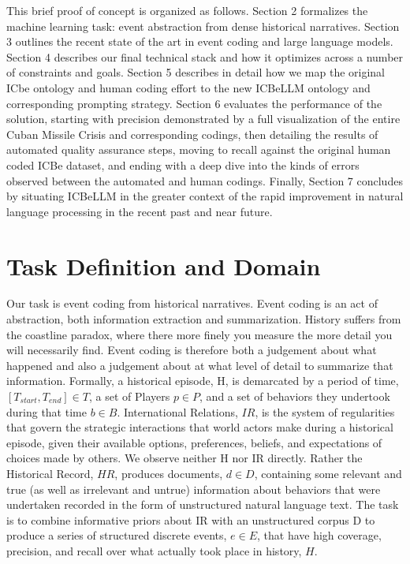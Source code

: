 \documentclass[
]{article}
\begin{document}
This brief proof of concept is organized as follows. Section 2
formalizes the machine learning task: event abstraction from dense
historical narratives. Section 3 outlines the recent state of the art in
event coding and large language models. Section 4 describes our final
technical stack and how it optimizes across a number of constraints and
goals. Section 5 describes in detail how we map the original ICbe
ontology and human coding effort to the new ICBeLLM ontology and
corresponding prompting strategy. Section 6 evaluates the performance of
the solution, starting with precision demonstrated by a full
visualization of the entire Cuban Missile Crisis and corresponding
codings, then detailing the results of automated quality assurance
steps, moving to recall against the original human coded ICBe dataset,
and ending with a deep dive into the kinds of errors observed between
the automated and human codings. Finally, Section 7 concludes by
situating ICBeLLM in the greater context of the rapid improvement in
natural language processing in the recent past and near future.

\section{Task Definition and Domain}\label{task-definition-and-domain}

Our task is event coding from historical narratives. Event coding is an
act of abstraction, both information extraction and summarization.
History suffers from the coastline paradox, where there more finely you
measure the more detail you will necessarily find. Event coding is
therefore both a judgement about what happened and also a judgement
about at what level of detail to summarize that information. Formally, a
historical episode, H, is demarcated by a period of time,
\([T_{start}, T_{end}] ∈ T\), a set of Players \(p ∈ P\), and a set of
behaviors they undertook during that time \(b ∈ B\). International
Relations, \(IR\), is the system of regularities that govern the
strategic interactions that world actors make during a historical
episode, given their available options, preferences, beliefs, and
expectations of choices made by others. We observe neither H nor IR
directly. Rather the Historical Record, \(HR\), produces documents,
\(d ∈ D\), containing some relevant and true (as well as irrelevant and
untrue) information about behaviors that were undertaken recorded in the
form of unstructured natural language text. The task is to combine
informative priors about IR with an unstructured corpus D to produce a
series of structured discrete events, \(e ∈ E\), that have high
coverage, precision, and recall over what actually took place in
history, \(H\).
\end{document}
